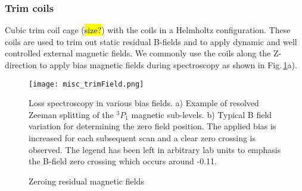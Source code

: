 
\subsubsection{Trim coils}
Cubic trim coil cage (\hl{size?}) with the coils in a Helmholtz configuration.
These coils are used to trim out static residual B-fields and to apply dynamic and well controlled external magnetic fields.
We commonly use the coils along the Z-direction to apply bias magnetic fields during spectroscopy as shown in Fig.\,\ref{fig:trimField}a).
	\begin{figure}
		\centerline{
		\texttt{[image: misc\_trimField.png]}}
		\caption{Zeroing residual magnetic fields}{Loss spectroscopy in various bias fields. a) Example of resolved Zeeman splitting of the $^3P_1$ magnetic sub-levels. b) Typical B field variation for determining the zero field position. The applied bias is increased for each subsequent scan and a clear zero crossing is observed. The legend has been left in arbitrary lab units to emphasis the B-field zero crossing which occurs around -0.11.}
		\label{fig:trimField}
	\end{figure} 
	
